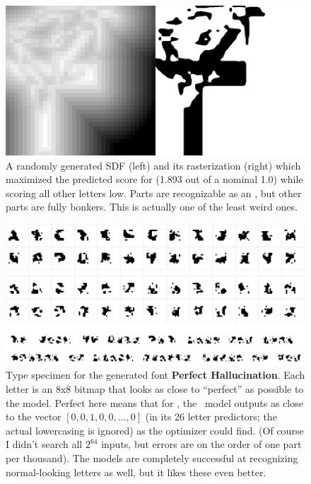 \documentclass[twocolumn]{article}
\begin{document}
\begin{figure}[tp]
\centering
  \includegraphics[width=0.9 \linewidth]{bonkersf}
\caption{ A randomly generated SDF (left) and its rasterization
  (right) which maximized the predicted score for 
  (1.893 out of a nominal 1.0) while 
  scoring all other letters low. Parts are recognizable as an
  , but other parts are fully bonkers. This is actually
  one of the least weird ones.
} \label{fig:bonkersf}
\end{figure}

\begin{figure}[tp]
\centering
  \includegraphics[width=0.9 \linewidth]{perfecthallucination}
\caption{
   Type specimen for the generated font {\bf Perfect Hallucination}.
   Each letter is an 8x8 bitmap that looks as close to ``perfect''
   as possible to the model. Perfect here means that for ,
   the \makelowercase\ model outputs as close to the vector
   $[0, 0, 1, 0, 0, \ldots, 0]$ (in its 26 letter predictors; the
   actual lowercasing is ignored) as the optimizer could find. (Of
   course I didn't search all $2^{64}$ inputs, but errors are
   on the order of one part per thousand). The models are completely
   successful at recognizing normal-looking letters as well, but
   it likes these even better.
} \label{fig:perfect}
\end{figure}
\end{document}
